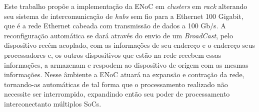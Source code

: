 \documentclass[a4paper,12pt]{article}
\begin{document}
Este trabalho propõe a implementação da ENoC em \textit{clusters} em \textit{rack} alterando seu sistema de intercomunicação de \textit{hubs} sem fio para a Ethernet 100 Gigabit, que é a rede Ethernet cabeada com transmissão de dados a 100 Gb/s. A reconfiguração automática se dará através do envio de um \textit{BroadCast}, pelo dispositivo recém acoplado, com as informações de seu endereço e o endereço seus processadores e, os outros dispositivos que estão na rede recebem essas informações, a armazenam e respodem ao dispositivo de origem com as mesmas informações. Nesse âmbiente a ENoC atuará na expansão e contração da rede, tornando-as automáticas de tal forma que o processamento realizado não necessite ser interrompido, expandindo então seu poder de processamento interconectanto múltiplos SoCs.

\end{document}
